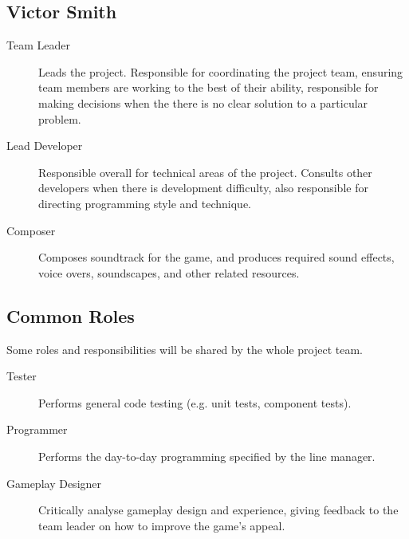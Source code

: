 \subsection{Victor Smith}
\begin{description}

    \item[Team Leader] Leads the project. Responsible for coordinating the project team, ensuring team members are working to the best of their ability, responsible for making decisions when the there is no clear solution to a particular problem.
      
    \item[Lead Developer] Responsible overall for technical areas of the project. Consults other developers when there is development difficulty, also responsible for directing programming style and technique.
    
    \item[Composer] Composes soundtrack for the game, and produces required sound effects, voice overs, soundscapes, and other related resources.
    
\end{description}

\subsection{Common Roles}

Some roles and responsibilities will be shared by the whole project team.
\begin{description}
    \item[Tester] Performs general code testing (e.g. unit tests, component tests).
    
    \item[Programmer] Performs the day-to-day programming specified by the line manager.
    
    \item[Gameplay Designer] Critically analyse gameplay design and experience, giving feedback to the team leader on how to improve the game's appeal.
\end{description}
